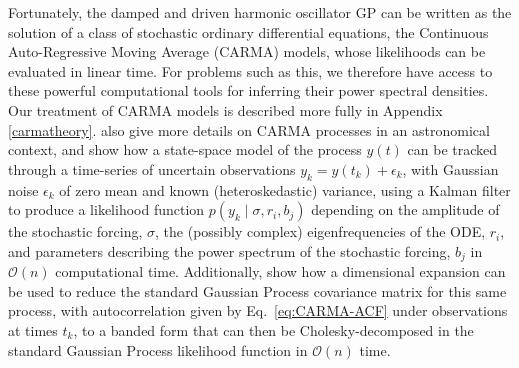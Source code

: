 \documentclass[modern]{aastex61}
\begin{document}
Fortunately, the damped and driven harmonic oscillator GP can be written as the
solution of a class of stochastic ordinary differential equations, the
Continuous Auto-Regressive Moving Average (CARMA) models, whose likelihoods can
be evaluated in linear time. For problems such as this, we therefore have access
to these powerful computational tools for inferring their power spectral
densities.  Our treatment of CARMA models is described more fully in Appendix
\ref{carmatheory}.   \citet{Kelly2014} also give more details on CARMA
processes in an astronomical context, and show how a state-space model of the
process $y(t)$ can be tracked through a time-series of uncertain observations
$y_k = y\left( t_k \right) + \epsilon_k$, with Gaussian noise $\epsilon_k$ of
zero mean and known (heteroskedastic) variance, using a Kalman filter to produce
a likelihood function $p\left( y_k \mid \sigma, r_i, b_j \right)$ depending on
the amplitude of the stochastic forcing, $\sigma$, the (possibly complex)
eigenfrequencies of the ODE, $r_i$, and parameters describing the power spectrum
of the stochastic forcing, $b_j$ in $\mathcal{O}\left( n \right)$ computational
time.  Additionally, \citet{Foreman-Mackey2017} show how a dimensional expansion
can be used to reduce the standard Gaussian Process covariance matrix for this
same process,  with autocorrelation given by Eq.\ \eqref{eq:CARMA-ACF} under
observations at times $t_k$, to a banded form that can then be
Cholesky-decomposed in the standard Gaussian Process likelihood function in
$\mathcal{O}\left( n \right)$ time.
\end{document}

